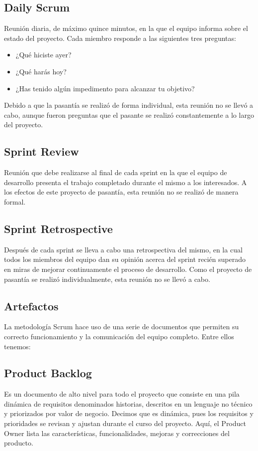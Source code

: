 \subsection{Daily Scrum}
Reunión diaria, de máximo quince minutos, en la que el equipo informa sobre el estado del proyecto. Cada miembro responde a las siguientes tres preguntas:

\begin{itemize}
	\item 	¿Qué hiciste ayer?
	\item 	¿Qué harás hoy?
	\item 	¿Has tenido algún impedimento para alcanzar tu objetivo?
\end{itemize}

Debido a que la pasantía se realizó de forma individual, esta reunión no se llevó a cabo, aunque fueron preguntas que el pasante se realizó constantemente a lo largo del proyecto.

\subsection{Sprint Review}
Reunión que debe realizarse al final de cada sprint en la que el equipo de desarrollo presenta el trabajo completado durante el mismo a los interesados.
A los efectos de este proyecto de pasantía, esta reunión no se realizó de manera formal.

\subsection{Sprint Retrospective}
Después de cada sprint se lleva a cabo una retrospectiva del mismo, en la cual todos los miembros del equipo dan su opinión acerca del sprint recién superado en miras de mejorar continuamente el proceso de desarrollo. Como el proyecto de pasantía se realizó individualmente, esta reunión no se llevó a cabo.

\subsection{Artefactos}
La metodología Scrum hace uso de una serie de documentos que permiten su correcto funcionamiento y la comunicación del equipo completo. Entre ellos tenemos:

\subsection{Product Backlog}
Es un documento de alto nivel para todo el proyecto que consiste en una pila dinámica de requisitos denominados historias, descritos en un lenguaje no técnico y priorizados por valor de negocio. Decimos que es dinámica, pues los requisitos y prioridades se revisan y ajustan durante el curso del proyecto. Aquí, el Product Owner lista las características, funcionalidades, mejoras y correcciones del producto.

